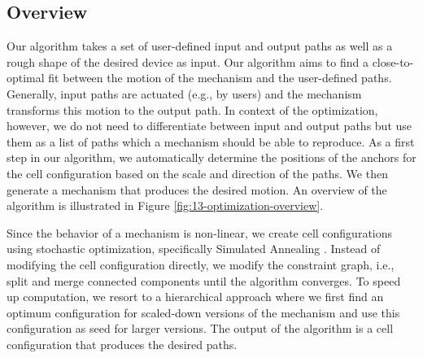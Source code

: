 \subsection{Overview}

Our algorithm takes a set of user-defined input and output paths as well as a rough shape of the desired device as input. Our algorithm aims to find a close-to-optimal fit between the motion of the mechanism and the user-defined paths. Generally, input paths are actuated (e.g., by users) and the mechanism transforms this motion to the output path. In context of the optimization, however, we do not need to differentiate between input and output paths but use them as a list of paths which a mechanism should be able to reproduce. As a first step in our algorithm, we automatically determine the positions of the anchors for the cell configuration based on the scale and direction of the paths. We then generate a mechanism that produces the desired motion. An overview of the algorithm is illustrated in Figure \ref{fig:13-optimization-overview}.

Since the behavior of a mechanism is non-linear, we create cell configurations using stochastic optimization, specifically Simulated Annealing \todo{[21][22]}. Instead of modifying the cell configuration directly, we modify the constraint graph, i.e., split and merge connected components until the algorithm converges. To speed up computation, we resort to a hierarchical approach where we first find an optimum configuration for scaled-down versions of the mechanism and use this configuration as seed for larger versions. The output of the algorithm is a cell configuration that produces the desired paths.

